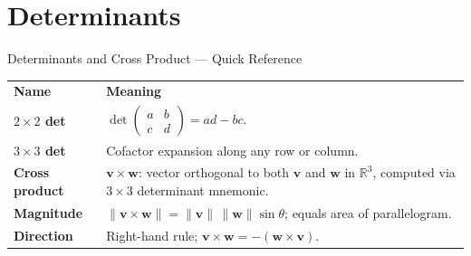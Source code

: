 

% 
\section{Determinants}

\begin{toolkitbox}{Determinants and Cross Product --- Quick Reference}
\begin{tabular}{@{}p{}p{}@{}}
\textbf{Name} & \textbf{Meaning} \\
\textbf{$2\times 2$ det}  & $\det\begin{pmatrix} a & b \\ c & d \end{pmatrix} = ad - bc$. \\[6pt]
\textbf{$3\times 3$ det}  & Cofactor expansion along any row or column. \\[4pt]
\textbf{Cross product}    & $\mathbf{v} \times \mathbf{w}$: vector orthogonal to both $\mathbf{v}$ and $\mathbf{w}$ in $\mathbb{R}^3$, computed via $3\times 3$ determinant mnemonic. \\[4pt]
\textbf{Magnitude}        & $\|\mathbf{v} \times \mathbf{w}\| = \|\mathbf{v}\|\,\|\mathbf{w}\|\sin\theta$; equals area of parallelogram. \\[4pt]
\textbf{Direction}        & Right-hand rule; $\mathbf{v} \times \mathbf{w} = -(\mathbf{w} \times \mathbf{v})$. \\
\end{tabular}
\end{toolkitbox}



% 
